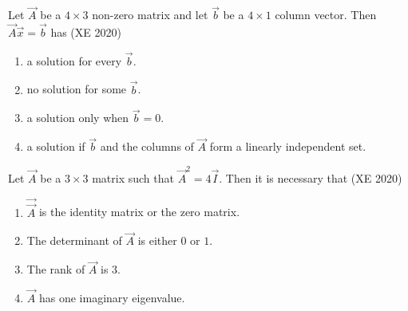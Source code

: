 \item Let $\vec{A}$ be a $4 \times 3$ non-zero matrix and let $\vec{b}$ be a $4 \times 1$ column vector. Then $\vec{A}\vec{x} = \vec{b}$ has  
\hfill (XE 2020)
\begin{enumerate}
\item a solution for every $\vec{b}$.  
\item no solution for some $\vec{b}$.  
\item a solution only when $\vec{b} = 0$.  
\item a solution if $\vec{b}$ and the columns of $\vec{A}$ form a linearly independent set.  
\end{enumerate}
  \item Let $\vec{A}$ be a $3 \times 3$ matrix such that $\vec{A}^2 = 4\vec{I}$. Then it is necessary that
  \hfill (XE 2020)
  \begin{enumerate}
    \item $\vec{\vec{A}}$ is the identity matrix or the zero matrix.
    \item The determinant of $\vec{A}$ is either $0$ or $1$.
    \item The rank of $\vec{A}$ is $3$.
    \item $\vec{A}$ has one imaginary eigenvalue.
  \end{enumerate}
